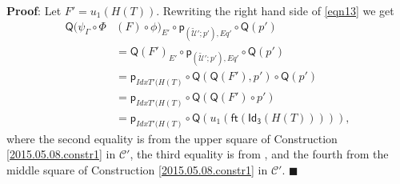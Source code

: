 \documentclass[12pt]{article}
\numberwithin{equation}{section}
\newenvironment{myproof}{{\bf Proof}:}{$\blacksquare$ \vskip 5mm }
\newcommand{\wt}{\widetilde}
\newcommand{\C}{{\mathcal C}}  %
\newcommand{\ft}{\mathsf{ft}}
\newcommand{\p}{\mathsf{p}}
\newcommand{\Idx}{\mathsf{Id_3}} %
\newcommand{\U}{\mathcal{U}}
\newcommand{\Q}{\mathsf{Q}}
\begin{document}
\begin{myproof}
Let $F'=u_1(H(T))$. Rewriting the right hand side of \ref{eqn13} we get
%
\begin{align*}
  \Q(\psi_{\Gamma}\circ \Phi&(F)\circ \phi)_{E'}\circ \p_{(\wt{\U}';p'),Eq'}\circ \Q(p') \\
    & = \Q(F')_{E'}\circ \p_{(\wt{\U}';p'),Eq'}\circ \Q(p') \\
    & = \p_{IdxT'(H(T)}\circ \Q(\Q(F'),p')\circ \Q(p') \\
    & = \p_{IdxT'(H(T)}\circ \Q(\Q(F')\circ p') \\
    & = \p_{IdxT'(H(T)}\circ \Q(u_1(\ft(\Idx(H(T))))),
\end{align*}
where the second equality is from the upper square of Construction
\ref{2015.05.08.constr1} in $\C'$, the third equality is from
\cite[Lemma 3.2]{fromunivwithPi}, and the fourth from the middle square of
Construction \ref{2015.05.08.constr1} in $\C'$.
\end{myproof}
\end{document}
